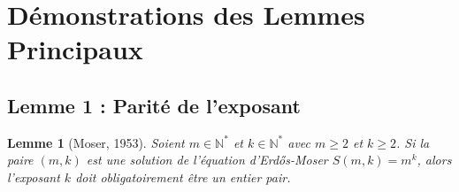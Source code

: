\documentclass[11pt,a4paper,french]{article}
\newtheorem{lemma}[theorem]{Lemme}
\theoremstyle{definition}
\theoremstyle{remark}
\begin{document}
\section{Démonstrations des Lemmes Principaux}
\label{sec:lemmas}

\subsection{Lemme 1 : Parité de l'exposant}
\label{subsec:lemma1}

\begin{lemma}[Moser, 1953]
Soient $m \in \mathbb{N}^*$ et $k \in \mathbb{N}^*$ avec $m \ge 2$ et $k \ge 2$. Si la paire $(m, k)$ est une solution de l'équation d'Erdős-Moser $S(m, k) = m^k$, alors l'exposant $k$ doit obligatoirement être un entier pair.
\end{lemma}
\end{document}
